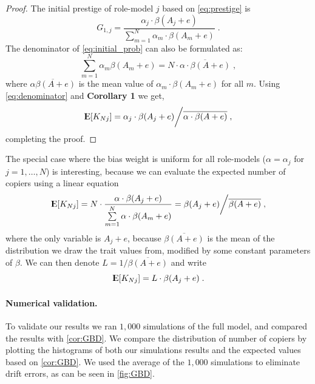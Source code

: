 \documentclass[12pt]{extarticle}
\DeclareMathOperator*{\E}{{\rm I\kern-.3em E}}
\begin{document}
\begin{proof}
The initial prestige of role-model $j$ based on \cref{eq:prestige} is
\begin{equation}\label{eq:initial_prob}
G_{1,j} = \frac{\alpha_j\cdot\beta(A_j+e)}{\sum\limits_{m=1}^{N} \alpha_m\cdot\beta(A_m+e)} \;.
\end{equation}
The denominator of \cref{eq:initial_prob} can also be formulated as:
\begin{equation}\label{eq:denominator}
 \sum\limits_{m=1}^{N}\alpha_m\beta(A_m+e) = N \cdot \overline{\alpha \cdot \beta(A+e)} \;,
\end{equation}
where $\overline{\alpha\beta(A+e)}$ is the mean value of $\alpha_m\cdot\beta(A_m+e)$ for all $m$.
Using \cref{eq:denominator} and \textbf{Corollary 1} we get,
\begin{equation}
\E[K_{Nj}] = \alpha_j \cdot \beta(A_j+e) \bigg/ \overline{\alpha \cdot \beta(A+e)} \;,
\end{equation}
completing the proof.
\end{proof}

The special case where the bias weight is uniform for all role-models ($\alpha = \alpha_j$ for $j=1,\ldots, N$) is interesting, because we can evaluate the expected number of copiers using a linear equation
\begin{equation}
\E[K_{Nj}]= N\cdot\frac{\alpha\cdot\beta(A_j+e)}{\sum\limits_{m=1}^{N}\alpha\cdot\beta(A_m+e)} =\beta(A_j+e) \bigg/ \overline{\beta(A+e)} \;,
\end{equation}
where the only variable is $A_j+e$, because $\overline{\beta(A+e)}$ is the mean of the distribution we draw the trait values from, modified by some constant parameters of $\beta$.
We can then denote $L = 1/\overline{\beta(A+e)}$ and write
\begin{equation}\label{eq:linearEq}
\E[K_{Nj}] = L\cdot \beta(A_j+e) \;.
\end{equation}

\paragraph{Numerical validation.}
To validate our results we ran $1,000$ simulations of the full model, and compared the results with \cref{cor:GBD}.
We compare the distribution of number of copiers by plotting the histograms of both our simulations results and the expected values based on \cref{cor:GBD}.
We used the average of the $1,000$ simulations to eliminate drift errors, as can be seen in \cref{fig:GBD}.
\end{document}
